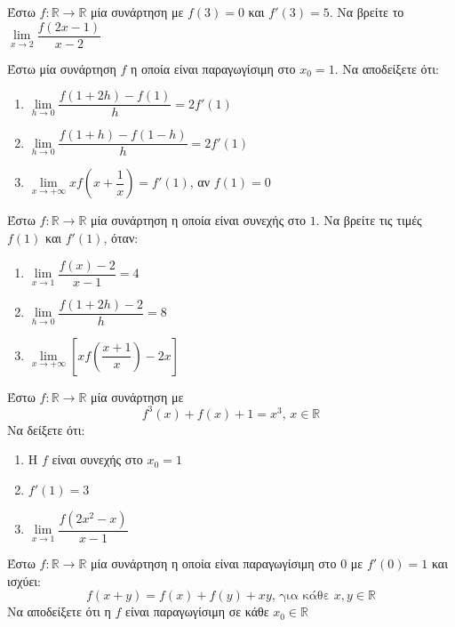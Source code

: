 \documentclass{presentation}
\begin{document}
\begin{askisi}
    Έστω $f:\mathbb{R}\to\mathbb{R}$ μία συνάρτηση με $f(3)=0$ και $f'(3)=5$. Να βρείτε το $\lim\limits_{x \to 2}{ \dfrac{f(2x-1)}{x-2} }$

\end{askisi}

\begin{askisi}
    Έστω μία συνάρτηση $f$ η οποία είναι παραγωγίσιμη στο $x_0=1$. Να αποδείξετε ότι:
    \begin{enumerate}
        \item<1-> $\lim\limits_{h \to 0}{ \dfrac{f(1+2h)-f(1)}{h} }=2f'(1)$
        \item<2-> $\lim\limits_{h \to 0}{ \dfrac{f(1+h)-f(1-h)}{h} }=2f'(1)$
        \item<3-> $\lim\limits_{x \to +\infty}{ xf\left( x+\dfrac{1}{x} \right) }=f'(1)$, αν $f(1)=0$
    \end{enumerate}

\end{askisi}

\begin{askisi}
    Έστω $f:\mathbb{R}\to\mathbb{R}$ μία συνάρτηση η οποία είναι συνεχής στο $1$. Να βρείτε τις τιμές $f(1)$ και $f'(1)$, όταν:
    \begin{enumerate}
        \item<1-> $\lim\limits_{x \to 1}{ \dfrac{f(x)-2}{x-1} }=4$
        \item<2-> $\lim\limits_{h \to 0}{ \dfrac{f(1+2h)-2}{h} }=8$
        \item<3-> $\lim\limits_{x \to +\infty}{ \left[ xf\left( \dfrac{x+1}{x} \right)-2x   \right]  }$
    \end{enumerate}

\end{askisi}

\begin{askisi}
    Έστω $f:\mathbb{R}\to\mathbb{R}$ μία συνάρτηση με
    $$f^3(x)+f(x)+1=x^3 \text{, } x\in\mathbb{R}$$
    Να δείξετε ότι:
    \begin{enumerate}
        \item<1-> Η $f$ είναι συνεχής στο $x_0=1$
        \item<2-> $f'(1)=3$
        \item<3-> $\lim\limits_{x \to 1}{ \dfrac{f(2x^2-x)}{x-1}  }$
    \end{enumerate}

\end{askisi}

\begin{askisi}
    Έστω $f:\mathbb{R}\to\mathbb{R}$ μία συνάρτηση η οποία είναι παραγωγίσιμη στο $0$ με $f'(0)=1$ και ισχύει:
    $$f(x+y)=f(x)+f(y)+xy \text{, για κάθε } x,y\in\mathbb{R}$$
    Να αποδείξετε ότι η $f$ είναι παραγωγίσιμη σε κάθε $x_0\in\mathbb{R}$

\end{askisi}
\end{document}
